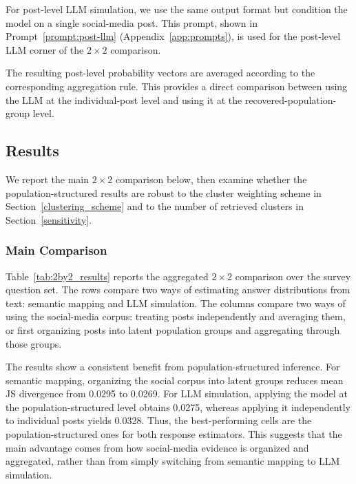 \documentclass{article}
\begin{document}
For post-level LLM simulation, we use the same output format but condition the model on a single social-media post.
This prompt, shown in Prompt~\ref{prompt:post-llm} (Appendix~\ref{app:prompts}), is used for the post-level LLM corner of the $2\times2$ comparison.

The resulting post-level probability vectors are averaged according to the corresponding aggregation rule.
This provides a direct comparison between using the LLM at the individual-post level and using it at the recovered-population-group level.

\subsection{Results}

We report the main $2\times2$ comparison below,
then examine whether the population-structured results are robust to the cluster weighting scheme in Section~\ref{clustering_scheme}
and to the number of retrieved clusters in Section~\ref{sensitivity}.

\subsubsection{Main Comparison}

Table~\ref{tab:2by2_results} reports the aggregated $2\times2$ comparison over the survey question set.
The rows compare two ways of estimating answer distributions from text:
semantic mapping and LLM simulation.
The columns compare two ways of using the social-media corpus:
treating posts independently and averaging them,
or first organizing posts into latent population groups and aggregating through those groups.

The results show a consistent benefit from population-structured inference.
For semantic mapping, organizing the social corpus into latent groups reduces mean JS divergence from 0.0295 to 0.0269.
For LLM simulation, applying the model at the population-structured level obtains 0.0275,
whereas applying it independently to individual posts yields 0.0328.
Thus, the best-performing cells are the population-structured ones for both response estimators.
This suggests that the main advantage comes from how social-media evidence is organized and aggregated,
rather than from simply switching from semantic mapping to LLM simulation.
\end{document}
